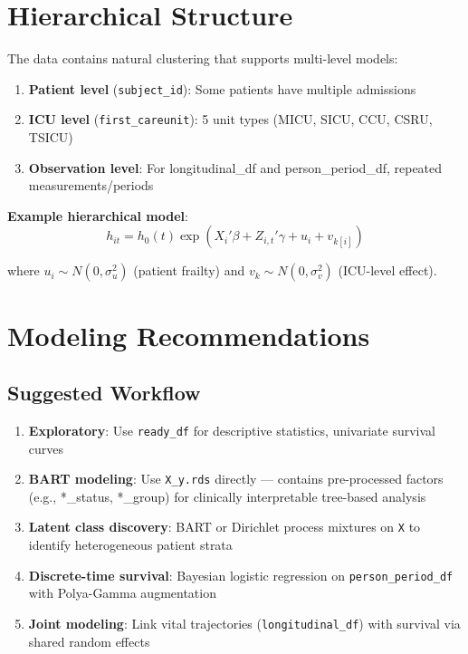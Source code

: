 \documentclass[11pt]{article}
\begin{document}
\section{Hierarchical Structure}

The data contains natural clustering that supports multi-level models:

\begin{enumerate}[leftmargin=*, nosep]
    \item \textbf{Patient level} (\texttt{subject\_id}): Some patients have multiple admissions
    \item \textbf{ICU level} (\texttt{first\_careunit}): 5 unit types (MICU, SICU, CCU, CSRU, TSICU)
    \item \textbf{Observation level}: For longitudinal\_df and person\_period\_df, repeated measurements/periods
\end{enumerate}

\textbf{Example hierarchical model}:
\[
h_{it} = h_0(t) \exp(X_i'\beta + Z_{i,t}'\gamma + u_i + v_{k[i]})
\]

where $u_i \sim N(0, \sigma^2_u)$ (patient frailty) and $v_k \sim N(0, \sigma^2_v)$ (ICU-level effect).

\section{Modeling Recommendations}

\subsection{Suggested Workflow}

\begin{enumerate}[leftmargin=*, nosep]
    \item \textbf{Exploratory}: Use \texttt{ready\_df} for descriptive statistics, univariate survival curves
    \item \textbf{BART modeling}: Use \texttt{X\_y.rds} directly --- contains pre-processed factors (e.g., *\_status, *\_group) for clinically interpretable tree-based analysis
    \item \textbf{Latent class discovery}: BART or Dirichlet process mixtures on \texttt{X} to identify heterogeneous patient strata
    \item \textbf{Discrete-time survival}: Bayesian logistic regression on \texttt{person\_period\_df} with Polya-Gamma augmentation
    \item \textbf{Joint modeling}: Link vital trajectories (\texttt{longitudinal\_df}) with survival via shared random effects
\end{enumerate}
\end{document}
